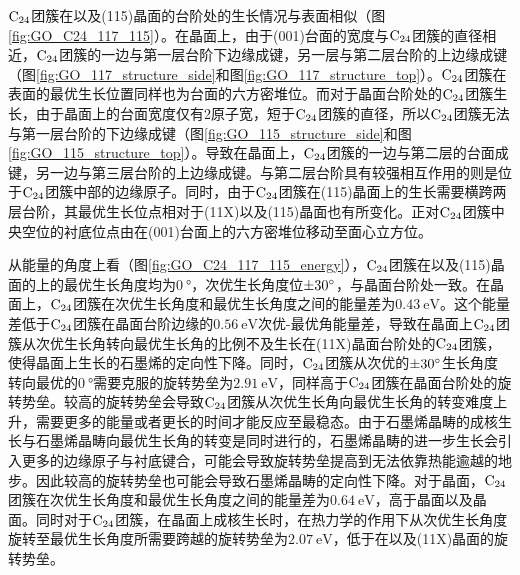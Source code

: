 $\rm{C_{24}}$团簇在以及(115)晶面的台阶处的生长情况与表面相似（图\ref{fig:GO_C24_117_115}）。在晶面上，由于(001)台面的宽度与$\rm{C_{24}}$团簇的直径相近，$\rm{C_{24}}$团簇的一边与第一层台阶下边缘成键，另一层与第二层台阶的上边缘成键（图\ref{fig:GO_117_structure_side}和图\ref{fig:GO_117_structure_top}）。$\rm{C_{24}}$团簇在表面的最优生长位置同样也为台面的六方密堆位。而对于晶面台阶处的$\rm{C_{24}}$团簇生长，由于晶面上的台面宽度仅有2原子宽，短于$\rm{C_{24}}$团簇的直径，所以$\rm{C_{24}}$团簇无法与第一层台阶的下边缘成键（图\ref{fig:GO_115_structure_side}和图\ref{fig:GO_115_structure_top}）。导致在晶面上，$\rm{C_{24}}$团簇的一边与第二层的台面成键，另一边与第三层台阶的上边缘成键。与第二层台阶具有较强相互作用的则是位于$\rm{C_{24}}$团簇中部的边缘原子。同时，由于$\rm{C_{24}}$团簇在(115)晶面上的生长需要横跨两层台阶，其最优生长位点相对于(11X)以及(115)晶面也有所变化。正对$\rm{C_{24}}$团簇中央空位的衬底位点由在(001)台面上的六方密堆位移动至面心立方位。

从能量的角度上看（图\ref{fig:GO_C24_117_115_energy}），$\rm{C_{24}}$团簇在以及(115)晶面的上的最优生长角度均为$\SI{0 }{\degree}$，次优生长角度位$\SI{\pm 30 }{\degree}$，与晶面台阶处一致。在晶面上，$\rm{C_{24}}$团簇在次优生长角度和最优生长角度之间的能量差为$\SI{0.43}{\electronvolt}$。这个能量差低于$\rm{C_{24}}$团簇在晶面台阶边缘的$\SI{0.56}{\electronvolt}$次优-最优角能量差，导致在晶面上$\rm{C_{24}}$团簇从次优生长角转向最优生长角的比例不及生长在(11X)晶面台阶处的$\rm{C_{24}}$团簇，使得晶面上生长的石墨烯的定向性下降。同时，$\rm{C_{24}}$团簇从次优的$\SI{\pm 30 }{\degree}$生长角度转向最优的$\SI{0}{\degree}$需要克服的旋转势垒为$\SI{2.91 }{\electronvolt}$，同样高于$\rm{C_{24}}$团簇在晶面台阶处的旋转势垒。较高的旋转势垒会导致$\rm{C_{24}}$团簇从次优生长角向最优生长角的转变难度上升，需要更多的能量或者更长的时间才能反应至最稳态。由于石墨烯晶畴的成核生长与石墨烯晶畴向最优生长角的转变是同时进行的，石墨烯晶畴的进一步生长会引入更多的边缘原子与衬底键合，可能会导致旋转势垒提高到无法依靠热能逾越的地步。因此较高的旋转势垒也可能会导致石墨烯晶畴的定向性下降。对于晶面，$\rm{C_{24}}$团簇在次优生长角度和最优生长角度之间的能量差为$\SI{0.64}{\electronvolt}$，高于晶面以及晶面。同时对于$\rm{C_{24}}$团簇，在晶面上成核生长时，在热力学的作用下从次优生长角度旋转至最优生长角度所需要跨越的旋转势垒为$\SI{2.07 }{\electronvolt}$，低于在以及(11X)晶面的旋转势垒。

